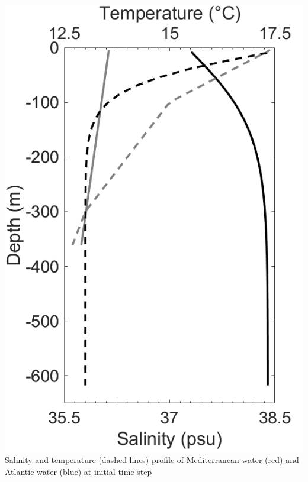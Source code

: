 \begin{minipage}{.4\textwidth}\centering
 \centering
 \includegraphics[width=\linewidth]{./papier2D/profil_LEx.png}
  {Salinity and temperature (dashed lines) profile of Mediterranean water (red) and Atlantic water (blue) at initial time-step}
\label{fig_LEx}
\end{minipage}
\vspace{1\baselineskip}





